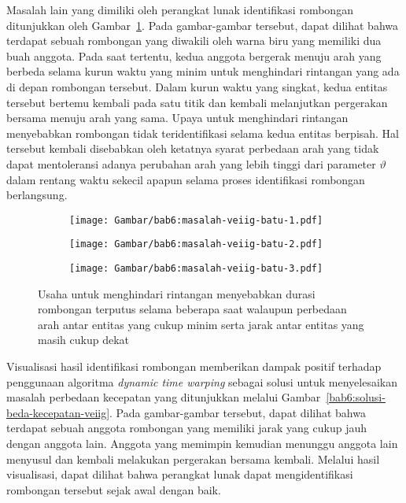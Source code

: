 Masalah lain yang dimiliki oleh perangkat lunak identifikasi rombongan ditunjukkan oleh Gambar~\ref{bab6:masalah-rintangan-veiig}. Pada gambar-gambar tersebut, dapat dilihat bahwa terdapat sebuah rombongan yang diwakili oleh warna biru yang memiliki dua buah anggota. Pada saat tertentu, kedua anggota bergerak menuju arah yang berbeda selama kurun waktu yang minim untuk menghindari rintangan yang ada di depan rombongan tersebut. Dalam kurun waktu yang singkat, kedua entitas tersebut bertemu kembali pada satu titik dan kembali melanjutkan pergerakan bersama menuju arah yang sama. Upaya untuk menghindari rintangan menyebabkan rombongan tidak teridentifikasi selama kedua entitas berpisah. Hal tersebut kembali disebabkan oleh ketatnya syarat perbedaan arah yang tidak dapat mentoleransi adanya perubahan arah yang lebih tinggi dari parameter $\vartheta$ dalam rentang waktu sekecil apapun selama proses identifikasi rombongan berlangsung.

\begin{figure}[h]
    \centering
    \captionsetup{width=.8\textwidth}
    \begin{subfigure}[t]{0.225\textwidth}
        \centering
        \texttt{[image: Gambar/bab6:masalah-veiig-batu-1.pdf]}
    \end{subfigure}
    \begin{subfigure}[t]{0.25\textwidth}
        \centering
        \texttt{[image: Gambar/bab6:masalah-veiig-batu-2.pdf]}
    \end{subfigure}
    \begin{subfigure}[t]{0.225\textwidth}
        \centering
        \texttt{[image: Gambar/bab6:masalah-veiig-batu-3.pdf]}
    \end{subfigure}
    \caption[Masalah menghindari rintangan]{Usaha untuk menghindari rintangan menyebabkan durasi rombongan terputus selama beberapa saat walaupun perbedaan arah antar entitas yang cukup minim serta jarak antar entitas yang masih cukup dekat}
    \label{bab6:masalah-rintangan-veiig}
\end{figure}

Visualisasi hasil identifikasi rombongan memberikan dampak positif terhadap penggunaan algoritma \textit{dynamic time warping} sebagai solusi untuk menyelesaikan masalah perbedaan kecepatan yang ditunjukkan melalui Gambar~\ref{bab6:solusi-beda-kecepatan-veiig}. Pada gambar-gambar tersebut, dapat dilihat bahwa terdapat sebuah anggota rombongan yang memiliki jarak yang cukup jauh dengan anggota lain. Anggota yang memimpin kemudian menunggu anggota lain menyusul dan kembali melakukan pergerakan bersama kembali. Melalui hasil visualisasi, dapat dilihat bahwa perangkat lunak dapat mengidentifikasi rombongan tersebut sejak awal dengan baik.

